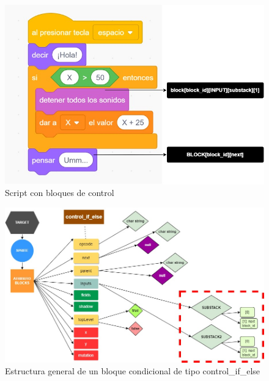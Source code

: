 \documentclass[a4paper, 12pt]{book}
\begin{document}
\begin{figure}
  \centering
  \includegraphics[width=13cm, keepaspectratio]{img/scratch_control.jpg}
  \caption{Script con bloques de control}
  \label{fig:scratch_control}
\end{figure}

\begin{figure}
  \centering
  \includegraphics[width=15cm, keepaspectratio]{img/controlblock_spe.jpg}
  \caption{Estructura general de un bloque condicional de tipo control\_if\_else}
  \label{fig:controlblock_spe}
\end{figure}
\end{document}
